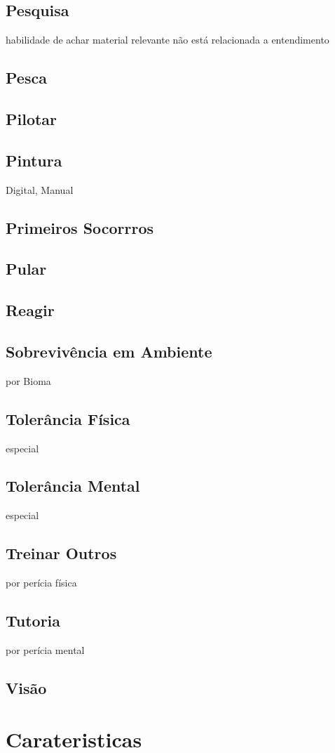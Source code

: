 \section{Pesquisa} habilidade de achar material relevante não está relacionada a entendimento %
\section{Pesca}
\section{Pilotar}
\section{Pintura} Digital, Manual
\section{Primeiros Socorrros}
\section{Pular}
\section{Reagir}
\section{Sobrevivência em Ambiente} por Bioma
\section{Tolerância Física} especial
\section{Tolerância Mental} especial
\section{Treinar Outros} por perícia física
\section{Tutoria} por perícia mental
\section{Visão}
%
%
%
%
%
%
%
%
%
%
\chapter{Carateristicas}
